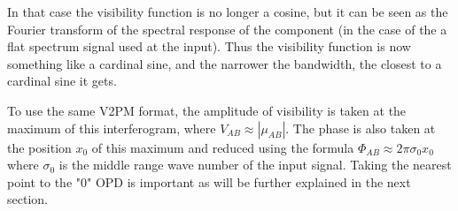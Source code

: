 In that case the visibility function is no longer a cosine, but it can be seen as the Fourier transform of the spectral response of the component (in the case of the a flat spectrum signal used at the input). Thus the visibility function is now something like a cardinal sine, and the narrower the bandwidth, the closest to a cardinal sine it gets.

To use the same V2PM format, the amplitude of visibility is taken at the maximum of this interferogram, where $V_{AB} \approx \left|\mu_{AB}\right|$. The phase is also taken at the position $x_0$ of this maximum and reduced using the formula $\Phi_{AB} \approx 2\pi\sigma_0 x_0$ where $\sigma_0$ is the middle range wave number of the input signal. Taking the nearest point to the "0" OPD is important as will be further explained in the next section.  

